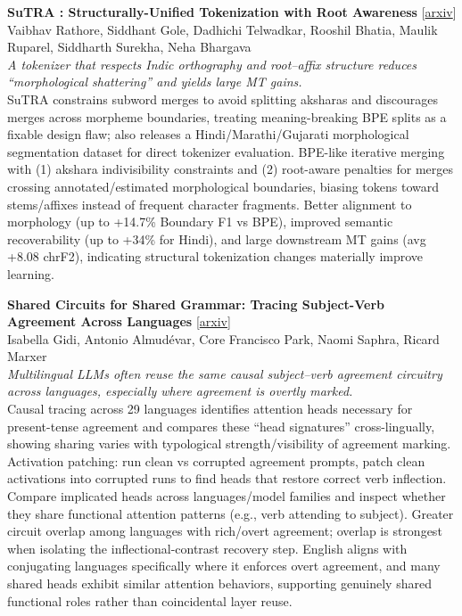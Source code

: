 \documentclass[12pt,letterpaper]{article}
\begin{document}
\medskip

{\small\textbf{SuTRA : Structurally-Unified Tokenization with Root Awareness}} {\scriptsize[\href{https://arxiv.org/abs/2608.18087}{arxiv}]}\\
{\scriptsize Vaibhav Rathore, Siddhant Gole, Dadhichi Telwadkar, Rooshil Bhatia, Maulik Ruparel, Siddharth Surekha, Neha Bhargava}\\

{\small\textit{A tokenizer that respects Indic orthography and root--affix structure reduces ``morphological shattering'' and yields large MT gains.}}\\[1pt]
{\footnotesize SuTRA constrains subword merges to avoid splitting aksharas and discourages merges across morpheme boundaries, treating meaning-breaking BPE splits as a fixable design flaw; also releases a Hindi/Marathi/Gujarati morphological segmentation dataset for direct tokenizer evaluation. BPE-like iterative merging with (1) akshara indivisibility constraints and (2) root-aware penalties for merges crossing annotated/estimated morphological boundaries, biasing tokens toward stems/affixes instead of frequent character fragments. Better alignment to morphology (up to +14.7\% Boundary F1 vs BPE), improved semantic recoverability (up to +34\% for Hindi), and large downstream MT gains (avg +8.08 chrF2), indicating structural tokenization changes materially improve learning.}

\medskip

{\small\textbf{Shared Circuits for Shared Grammar: Tracing Subject-Verb Agreement Across Languages}} {\scriptsize[\href{https://arxiv.org/abs/2608.18545}{arxiv}]}\\
{\scriptsize Isabella Gidi, Antonio Almud\'evar, Core Francisco Park, Naomi Saphra, Ricard Marxer}\\

{\small\textit{Multilingual LLMs often reuse the same causal subject--verb agreement circuitry across languages, especially where agreement is overtly marked.}}\\[1pt]
{\footnotesize Causal tracing across 29 languages identifies attention heads necessary for present-tense agreement and compares these ``head signatures'' cross-lingually, showing sharing varies with typological strength/visibility of agreement marking. Activation patching: run clean vs corrupted agreement prompts, patch clean activations into corrupted runs to find heads that restore correct verb inflection. Compare implicated heads across languages/model families and inspect whether they share functional attention patterns (e.g., verb attending to subject). Greater circuit overlap among languages with rich/overt agreement; overlap is strongest when isolating the inflectional-contrast recovery step. English aligns with conjugating languages specifically where it enforces overt agreement, and many shared heads exhibit similar attention behaviors, supporting genuinely shared functional roles rather than coincidental layer reuse.}
\end{document}
